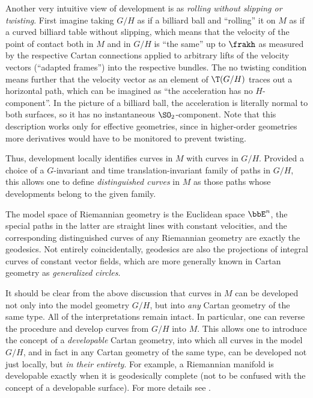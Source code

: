 \begin{rem}
    Another very intuitive view of development is as \emph{rolling without slipping or twisting}. First imagine taking $G\slash H$ as if a billiard ball and ``rolling'' it on $M$ as if a curved billiard table without slipping, which means that the velocity of the point of contact both in $M$ and in $G\slash H$ is ``the same'' up to $\frakh$ as measured by the respective Cartan connections applied to arbitrary lifts of the velocity vectors (``adapted frames'') into the respective bundles. The no twisting condition means further that the velocity vector as an element of $\T(G\slash H)$ traces out a horizontal path, which can be imagined as ``the acceleration has no $H$-component''. In the picture of a billiard ball, the acceleration is literally normal to both surfaces, so it has no instantaneous $\SO_2$-component. Note that this description works only for effective geometries, since in higher-order geometries more derivatives would have to be monitored to prevent twisting.
\end{rem}

Thus, development locally identifies curves in $M$ with curves in $G\slash H$. Provided a choice of a $G$-invariant and time translation-invariant family of paths in $G\slash H$, this allows one to define \emph{distinguished curves} in $M$ as those paths whose developments belong to the given family. 

\begin{example}
    The model space of Riemannian geometry is the Euclidean space $\bbE^n$, the special paths in the latter are straight lines with constant velocities, and the corresponding distinguished curves of any Riemannian geometry are exactly the geodesics. Not entirely coincidentally, geodesics are also the projections of integral curves of constant vector fields, which are more generally known in Cartan geometry as \emph{generalized circles}.
\end{example}

\begin{rem}
    It should be clear from the above discussion that curves in $M$ can be developed not only into the model geometry $G\slash H$, but into \emph{any} Cartan geometry of the same type. All of the interpretations remain intact. In particular, one can reverse the procedure and develop curves from $G\slash H$ into $M$. This allows one to introduce the concept of a \emph{developable} Cartan geometry, into which all curves in the model $G\slash H$, and in fact in any Cartan geometry of the same type, can be developed not just locally, but \emph{in their entirety}. For example, a Riemannian manifold is developable exactly when it is geodesically complete (not to be confused with the concept of a developable surface). For more details see \cite{McKayCartan}. 
\end{rem}

